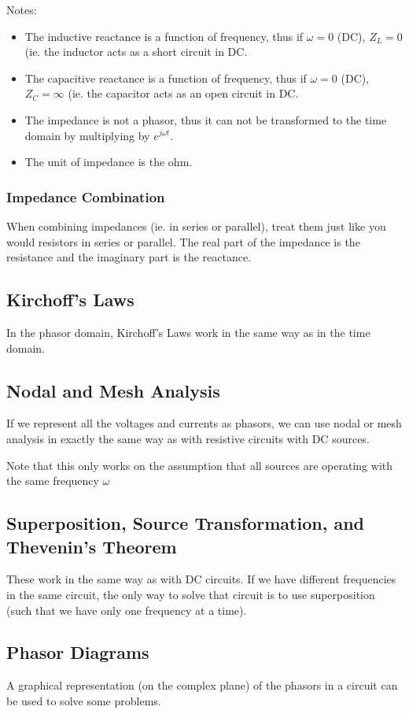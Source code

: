 \documentclass[12pt]{article}
\begin{document}
Notes:
\begin{itemize}
\item The inductive reactance is a function of frequency, thus if $\omega = 0$ (DC), $Z_L = 0$ (ie. the inductor acts as a short circuit in DC.
\item The capacitive reactance is a function of frequency, thus if $\omega = 0$ (DC), $Z_C = \infty$ (ie. the capacitor acts as an open circuit in DC.
\item The impedance is not a phasor, thus it can not be transformed to the time domain by multiplying by $e^{j\omega t}$.
\item The unit of impedance is the ohm.
\end{itemize}

\subsubsection*{Impedance Combination}
When combining impedances (ie. in series or parallel), treat them just like you would resistors in series or parallel. The real part of the impedance is the resistance and the imaginary part is the reactance.

\subsection*{Kirchoff's Laws}
In the phasor domain, Kirchoff's Laws work in the same way as in the time domain.

\subsection*{Nodal and Mesh Analysis}
If we represent all the voltages and currents as phasors, we can use nodal or mesh analysis in exactly the same way as with resistive circuits with DC sources.

Note that this only works on the assumption that all sources are operating with the same frequency $\omega$

\subsection*{Superposition, Source Transformation, and Thevenin's Theorem}
These work in the same way as with DC circuits. If we have different frequencies in the same circuit, the only way to solve that circuit is to use superposition (such that we have only one frequency at a time).

\subsection*{Phasor Diagrams}
A graphical representation (on the complex plane) of the phasors in a circuit can be used to solve some problems.
\end{document}
